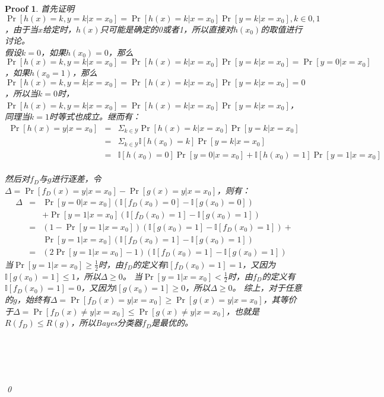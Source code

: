 \documentclass[a4paper,UTF8]{article}
\numberwithin{equation}{section}
\newtheorem*{myProof}{Proof}
\begin{document}
	\begin{myProof}
首先证明$\Pr[h(x)=k, y=k | x = x_0] = \Pr[h(x) = k | x = x_0] \Pr[y=k | x = x_0], k \in {0, 1} $，由于当$x$给定时，$h(x)$只可能是确定的0或者1，所以直接对$h(x_0)$的取值进行讨论。
~\\
假设$k=0$，如果$h(x_0)=0$，那么$\Pr[h(x)=k, y=k | x = x_0] = \Pr[h(x) = k | x = x_0] \Pr[y=k | x = x_0] = \Pr[y=0 | x = x_0]$，如果$h(x_0 = 1)$，那么$\Pr[h(x)=k, y=k | x = x_0] = \Pr[h(x) = k | x = x_0] \Pr[y=k | x = x_0] = 0$，所以当$k=0$时，$\Pr[h(x)=k, y=k | x = x_0] = \Pr[h(x) = k | x = x_0] \Pr[y=k | x = x_0]$，同理当$k=1$时等式也成立。继而有：
\begin{eqnarray*}
\Pr[h(x) = y | x = x_0] &=& \Sigma _ {k \in \mathcal{Y}} \Pr[h(x) = k |x = x_0] \Pr [y = k | x = x_0] \\
&=& \Sigma _ {k \in \mathcal{Y}} \mathbb{I}[h(x_0) = k] \Pr [y = k | x = x_0] \\
&=& \mathbb{I}[h(x_0) = 0] \Pr [y = 0 | x = x_0] + \mathbb{I}[h(x_0) = 1] \Pr [y = 1 | x = x_0] 
\end{eqnarray*}
~\\
然后对$f_D$与$g$进行逐差，令$\Delta = \Pr[f_D(x) = y | x = x_0] - \Pr[g(x) = y | x = x_0]$，则有：
\begin{eqnarray*}
	\Delta &=& \Pr [y = 0 | x = x_0] (\mathbb{I}[f_D(x_0) = 0] - \mathbb{I}[g(x_0) = 0]) \\
	&& + \Pr [y = 1 | x = x_0] (\mathbb{I}[f_D(x_0) = 1] - \mathbb{I}[g(x_0) = 1]) \\
&=& (1 - \Pr[y=1 | x = x_0])(\mathbb{I}[g(x_0) = 1] - \mathbb{I}[f_D(x_0) = 1]) + \\
&& \Pr [y = 1 | x = x_0] (\mathbb{I}[f_D(x_0) = 1] - \mathbb{I}[g(x_0) = 1]) \\
&=& (2\Pr [y = 1 | x = x_0] -1) (\mathbb{I}[f_D(x_0) = 1] - \mathbb{I}[g(x_0) = 1]) 
\end{eqnarray*}
当$\Pr [y = 1 | x = x_0] \ge \frac{1}{2}$时，由$f_D$的定义有$\mathbb{I}[f_D(x_0)=1] = 1$，又因为$\mathbb{I}[g(x_0) = 1] \le 1$，所以$\Delta \ge 0$。
当$\Pr [y = 1 | x = x_0] < \frac{1}{2}$时，由$f_D$的定义有$\mathbb{I}[f_D(x_0)=1] = 0$，又因为$\mathbb{I}[g(x_0) = 1] \ge 0$，所以$\Delta \ge 0$。
综上，对于任意的$g$，始终有$\Delta = \Pr[f_D(x) = y | x = x_0] \ge \Pr[g(x) = y | x = x_0]$，其等价于$\Delta = \Pr[f_D(x) \ne y | x = x_0] \le \Pr[g(x) \ne y | x = x_0]$，也就是$R(f_D) \le R(g)$，所以Bayes分类器$f_D$是最优的。
		
		~\\
		~\\
		~\\
		~\\	
		\qed
	\end{myProof}
	\newpage
	
\end{document}
